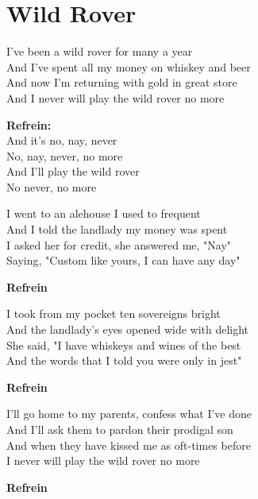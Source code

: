 \section{Wild Rover}
I've been a wild rover for many a year\\
And I've spent all my money on whiskey and beer\\
And now I'm returning with gold in great store\\
And I never will play the wild rover no more

\textbf{Refrein:}\\
And it's no, nay, never\\
No, nay, never, no more\\
And I'll play the wild rover\\
No never, no more

I went to an alehouse I used to frequent\\
And I told the landlady my money was spent\\
I asked her for credit, she answered me, "Nay"\\
Saying, "Custom like yours, I can have any day"

\textbf{Refrein}

I took from my pocket ten sovereigns bright\\
And the landlady's eyes opened wide with delight\\
She said, "I have whiskeys and wines of the best\\
And the words that I told you were only in jest"

\textbf{Refrein}

I'll go home to my parents, confess what I've done\\
And I'll ask them to pardon their prodigal son\\
And when they have kissed me as oft-times before\\
I never will play the wild rover no more

\textbf{Refrein}
